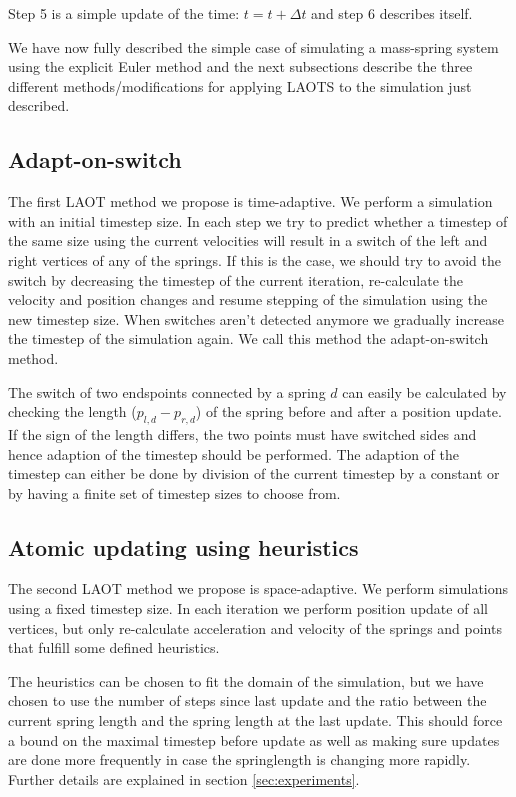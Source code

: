 \documentclass[11pt]{article}
\begin{document}
Step 5 is a simple update of the time: $t = t + \Delta t$ and step 6 describes
itself.

We have now fully described the simple case of simulating a mass-spring system
using the explicit Euler method and the next subsections describe the three
different methods/modifications for applying LAOTS to the simulation just
described.

\subsection{Adapt-on-switch}
The first LAOT method we propose is time-adaptive. We perform a simulation
with an initial timestep size. In each step we try to predict whether a timestep
of the same size using the current velocities will result in a switch of the
left and right vertices of any of the springs. If this is the case, we should
try to avoid the switch by decreasing the timestep of the current iteration,
re-calculate the velocity and position changes and resume stepping of the
simulation using the new timestep size. When switches aren't detected anymore
we gradually increase the timestep of the simulation again. We call this
method the adapt-on-switch method.

The switch of two endspoints connected by a spring $d$ can easily be
calculated by checking the length ($p_{l,d} - p_{r,d}$) of the spring before
and after a position update. If the sign of the length differs, the two
points must have switched sides and hence adaption of the timestep should be
performed. The adaption of the timestep can either be done by division of the
current timestep by a constant or by having a finite set of timestep sizes to
choose from.

\subsection{Atomic updating using heuristics}
The second LAOT method we propose is space-adaptive. We perform simulations
using a fixed timestep size. In each iteration we perform position update of
all vertices, but only re-calculate acceleration and velocity of the springs
and points that fulfill some defined heuristics.

The heuristics can be chosen to fit the domain of the simulation, but we have
chosen to use the number of steps since last update and the ratio between the
current spring length and the spring length at the last update. This should
force a bound on the maximal timestep before update as well as making sure
updates are done more frequently in case the springlength is changing more
rapidly. Further details are explained in section \ref{sec:experiments}.
\end{document}
